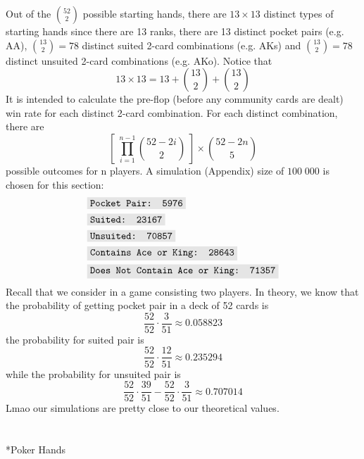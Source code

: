 \documentclass{article}
\newcommand{\code}[1]{\colorbox{codegray}{\texttt{#1}}}
\begin{document}
Out of the $\displaystyle \binom{52}{2}$ possible starting hands, there 
are $13 \times 13$ distinct types of starting hands since there are 13 
ranks, there are 13 distinct pocket pairs (e.g. AA), $\displaystyle 
\binom{13}{2} = 78$ distinct suited 2-card combinations (e.g. AKs) 
and $\displaystyle \binom{13}{2} = 78$ distinct unsuited 2-card 
combinations (e.g. AKo). Notice that 
\[
    13 \times 13 = 13 + \binom{13}{2} + \binom{13}{2}
\]
It is intended to calculate the pre-flop 
(before any community cards are dealt) win rate for each distinct 
2-card combination. For each distinct combination, there are 
\[
    \left[ \; \prod_{i = 1}^{n - 1} \binom{52 - 2i}{2} \; \right] \times \binom{52 - 2n}{5}
\] 
possible outcomes for n players. A simulation (Appendix) 
size of $100 \; 000$ is chosen for this section:
\begin{align*}
    & \code{Pocket Pair: 5976} \\
    & \code{Suited: 23167} \\
    & \code{Unsuited: 70857} \\
    & \code{Contains Ace or King: 28643} \\
    & \code{Does Not Contain Ace or King: 71357}
\end{align*}
Recall that we consider in a game consisting two players. In theory, we 
know that the probability of getting pocket pair in a deck of 52 cards is
\[
    \frac{52}{52} \cdot \frac{3}{51} \approx \boxed{0.058823}
\]
the probability for suited pair is 
\[
    \frac{52}{52} \cdot \frac{12}{51} \approx \boxed{0.235294}
\]
while the probability for unsuited pair is 
\[
    \frac{52}{52} \cdot \frac{39}{51} - \frac{52}{52} \cdot \frac{3}{51} 
    \approx \boxed{0.707014}
\]
Lmao our simulations are pretty close to our theoretical values. 


\section{}*{Poker Hands}
\end{document}
